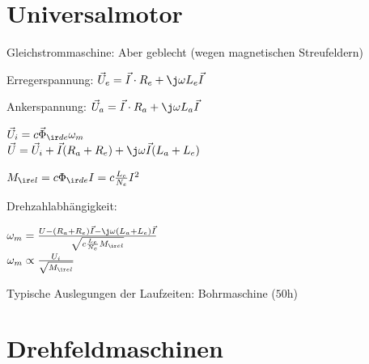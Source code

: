 \documentclass[german]{latex4ei_fs}
\begin{document}
\section{Universalmotor}

\begin{sectionbox}
Gleichstrommaschine: Aber geblecht (wegen magnetischen Streufeldern)


Erregerspannung: $\vec U_e = \vec I \cdot R_e + \j \omega L_e \vec I$

Ankerspannung: $\vec U_a = \vec I \cdot R_a + \j \omega L_a \vec I$

$\vec U_i = c \vec \Phi_{\ir de} \omega_m$ \\


$\vec U = \vec U_i + \vec I (R_a + R_e) + \j \omega \vec I (L_a + L_e)$

$M_{\ir el} = c \Phi_{\ir de} I = c \frac{L_e}{N_e} I^2$

Drehzahlabhängigkeit:

$\omega_m = \frac{U- (R_a + R_e) \vec I - \j \omega (L_a + L_e) \vec I}{\sqrt{c \frac{L_e}{N_e}M_{\ir el}}}$ \\
$\omega_m \propto \frac{U_i}{\sqrt{M_{\ir el}}}$

Typische Auslegungen der Laufzeiten: Bohrmaschine ($50 \si{\hour}$)
\end{sectionbox}
\section{Drehfeldmaschinen}
\end{document}
